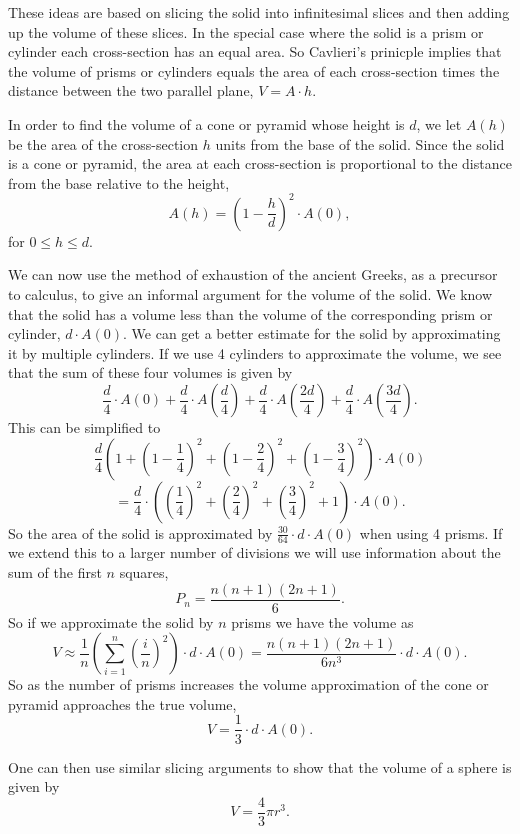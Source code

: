 \documentclass[
]{book}
\theoremstyle{definition}
\theoremstyle{definition}
\theoremstyle{definition}
\theoremstyle{definition}
\theoremstyle{remark}
\begin{document}
These ideas are based on slicing the solid into infinitesimal slices and then adding up the volume of these slices. In the special case where the solid is a prism or cylinder each cross-section has an equal area. So Cavlieri's prinicple implies that the volume of prisms or cylinders equals the area of each cross-section times the distance between the two parallel plane, \(V= A \cdot h\).

In order to find the volume of a cone or pyramid whose height is \(d\), we let \(A(h)\) be the area of the cross-section \(h\) units from the base of the solid. Since the solid is a cone or pyramid, the area at each cross-section is proportional to the distance from the base relative to the height, \[A(h) = \left( 1 - \frac{h}{d}\right)^2 \cdot A(0),\] for \(0\leq h \leq d\).

We can now use the method of exhaustion of the ancient Greeks, as a precursor to calculus, to give an informal argument for the volume of the solid. We know that the solid has a volume less than the volume of the corresponding prism or cylinder, \(d \cdot A(0)\). We can get a better estimate for the solid by approximating it by multiple cylinders. If we use 4 cylinders to approximate the volume, we see that the sum of these four volumes is given by
\[\frac{d}{4} \cdot A(0) + \frac{d}{4} \cdot A\left(\frac{d}{4}\right) + \frac{d}{4} \cdot A\left(\frac{2d}{4}\right) + \frac{d}{4} \cdot A\left(\frac{3d}{4}\right).\]
This can be simplified to
\[\frac{d}{4} \left( 1+\left(1-\frac{1}{4}\right)^2 + \left(1-\frac{2}{4}\right)^2 + \left(1-\frac{3}{4}\right)^2 \right) \cdot A(0)\]
\[= \frac{d}{4} \cdot \left( \left(\frac{1}{4}\right)^2 + \left(\frac{2}{4}\right)^2 + \left(\frac{3}{4}\right)^2+1\right) \cdot A(0).\]
So the area of the solid is approximated by \(\frac{30}{64} \cdot d \cdot A(0)\) when using 4 prisms. If we extend this to a larger number of divisions we will use information about the sum of the first \(n\) squares, \[P_n = \frac{n(n+1)(2n+1)}{6}.\] So if we approximate the solid by \(n\) prisms we have the volume as
\[ V \approx \frac{1}{n} \left(\sum_{i=1}^n \left( \frac{i}{n}\right)^2 \right) \cdot d \cdot A(0) = \frac{n(n+1)(2n+1)}{6n^3} \cdot d \cdot A(0).\] So as the number of prisms increases the volume approximation of the cone or pyramid approaches the true volume, \[V=\frac{1}{3} \cdot d \cdot A(0).\]

One can then use similar slicing arguments to show that the volume of a sphere is given by
\[V = \frac{4}{3} \pi r^3.\]
\end{document}
